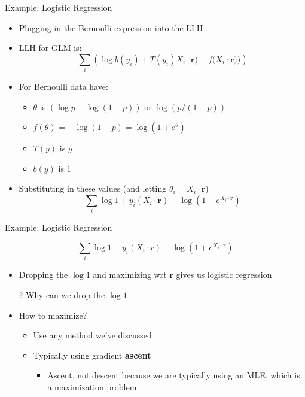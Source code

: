 \documentclass[aspectratio=169]{beamer}
\begin{document}
\begin{frame}{Example: Logistic Regression}

\begin{itemize}
\item Plugging in the Bernoulli expression into the LLH
\item LLH for GLM is:
$$\sum_i \left( \log b(y_i) + T(y_i)X_i \cdot \boldsymbol{r} \Big) - f \Big(X_i \cdot \boldsymbol{r} \Big) \Big) \right)$$
\item For Bernoulli data have:
	\begin{itemize}
	\item $\theta$ is $(\log p - \log (1 - p))$ or $\log (p / (1 - p))$
	\item $f(\theta)$ = $-\log (1 - p) = \log (1 + e^\theta)$ 
	\item $T (y)$ is $y$
	\item $b (y)$ is $1$
	\end{itemize}
\item Substituting in these values (and letting $\theta_i = X_i \cdot \boldsymbol{r}$)
$$\sum_i \log 1 + y_i (X_i \cdot \boldsymbol{r}) - \log (1 + e^{X_i \cdot \boldsymbol{r}})$$
\end{itemize}
\end{frame}
\begin{frame}{Example: Logistic Regression}

$$\sum_i \log 1 + y_i (X_i \cdot r) - \log (1 + e^{X_i \cdot \boldsymbol{r}})$$
\begin{itemize}
\item Dropping the $\log 1$ and maximizing wrt $\boldsymbol{r}$ gives us logistic regression
\item[?] Why can we drop the $\log 1$
\item How to maximize?
\begin{itemize}
\item Use any method we've discussed
\item Typically using gradient \textbf{ascent} %
\begin{itemize}
\item Ascent, not descent because we are typically using an MLE, which is a maximization problem
\end{itemize}
\end{itemize}
\end{itemize}
\end{frame}
\end{document}
